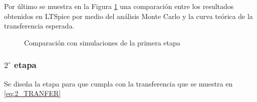 Por \'ultimo se muestra en la Figura \ref{fig:FIRST_LT_VS_TEO} una comparaci\'on entre los resultados obtenidos en LTSpice por medio del an\'alisis Monte Carlo y la curva te\'orica de la transferencia esperada.
\begin{figure}[H]
    \centering
    \caption{Comparaci\'on con simulaciones de la primera etapa}
    \label{fig:FIRST_LT_VS_TEO}
\end{figure}

\subsubsection{$2^\circ$ etapa}
Se dise\~na la etapa para que cumpla con la transferencia que se muestra en \ref{eq:2_TRANFER}

